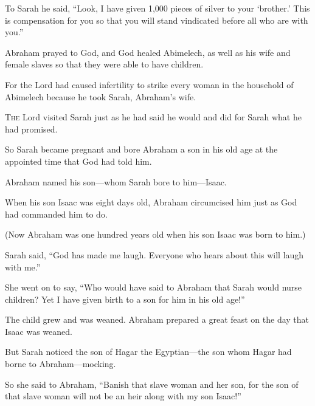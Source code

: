 \begin{scripture}
 To Sarah he said, ``Look, I have given 1,000 pieces of silver to your `brother.' This is compensation for you so that you will stand vindicated before all who are with you.''
\everypar{}

 Abraham prayed to God, and God healed Abimelech, as well as his wife and female slaves so that they were able to have children.
 For the Lord had caused infertility to strike every woman in the household of Abimelech because he took Sarah, Abraham's wife.

 \allowchapbreak\hypertarget{ch-genesis-21}{}\lettrine[lines=5]{\color{pentateuch}T}{\textsc{he}} Lord visited Sarah just as he had said he would and did for Sarah what he had promised.\everypar{}
 So Sarah became pregnant and bore Abraham a son in his old age at the appointed time that God had told him.
 Abraham named his son---whom Sarah bore to him---Isaac.
 When his son Isaac was eight days old, Abraham circumcised him just as God had commanded him to do.
 (Now Abraham was one hundred years old when his son Isaac was born to him.)
\everypar{}

 Sarah said, ``God has made me laugh. Everyone who hears about this will laugh with me.''
 She went on to say, ``Who would have said to Abraham that Sarah would nurse children? Yet I have given birth to a son for him in his old age!''
\everypar{}

 The child grew and was weaned. Abraham prepared a great feast on the day that Isaac was weaned.
 But Sarah noticed the son of Hagar the Egyptian---the son whom Hagar had borne to Abraham---mocking.
 So she said to Abraham, ``Banish that slave woman and her son, for the son of that slave woman will not be an heir along with my son Isaac!''
\everypar{}


\end{scripture}
